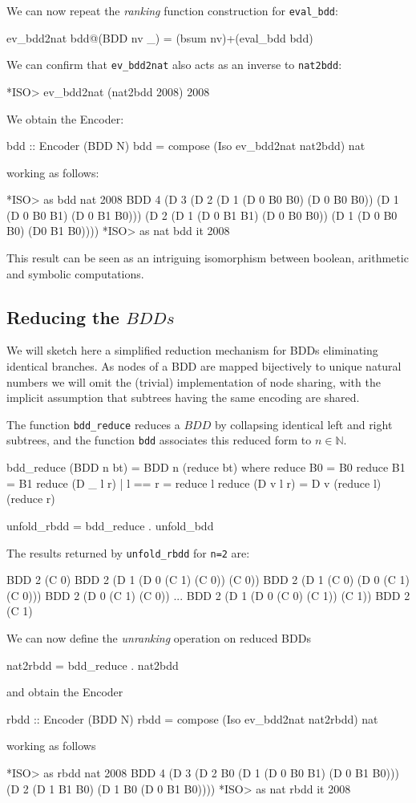 \documentclass[]{INCLUDES/llncs}
\begin{document}
We can now repeat the {\em ranking} function construction for {\tt eval\_bdd}:
\begin{code}
ev_bdd2nat bdd@(BDD nv _) = (bsum nv)+(eval_bdd bdd)
\end{code}
We can confirm that {\tt ev\_bdd2nat} also acts as an inverse to
{\tt nat2bdd}:
\begin{codex}
*ISO> ev_bdd2nat (nat2bdd 2008)
2008
\end{codex}

We obtain the Encoder:
\begin{code}
bdd :: Encoder (BDD N)
bdd = compose (Iso ev_bdd2nat nat2bdd) nat
\end{code}
working as follows:
\begin{codex}
*ISO> as bdd nat 2008
BDD 4 (D 3 (D 2 (D 1 (D 0 B0 B0) (D 0 B0 B0)) 
                (D 1 (D 0 B0 B1) (D 0 B1 B0))) 
           (D 2 (D 1 (D 0 B1 B1) (D 0 B0 B0)) 
                (D 1 (D 0 B0 B0) (D0 B1 B0))))
*ISO> as nat bdd it
2008
\end{codex}
This result can be seen as an intriguing isomorphism between
boolean, arithmetic and symbolic computations.

\subsection{Reducing the $BDDs$}
We will sketch here a simplified reduction mechanism for BDDs
eliminating identical branches. As nodes of a BDD are mapped
bijectively to unique natural numbers we will omit
the (trivial) implementation of node sharing, with the
implicit assumption that subtrees having the same encoding
are shared.

The function {\tt bdd\_reduce} reduces a $BDD$ by collapsing identical 
left and right subtrees, and the function {\tt bdd} 
associates this reduced form to $n \in \mathbb{N}$.
\begin{code}
bdd_reduce (BDD n bt) = BDD n (reduce bt) where
  reduce B0 = B0
  reduce B1 = B1
  reduce (D _ l r) | l == r = reduce l
  reduce (D v l r) = D v (reduce l) (reduce r)

unfold_rbdd = bdd_reduce . unfold_bdd  
\end{code}

The results returned by {\tt unfold\_rbdd} for {\tt n=2} are:
\begin{codex}
  BDD 2 (C 0)
  BDD 2 (D 1 (D 0 (C 1) (C 0)) (C 0))
  BDD 2 (D 1 (C 0) (D 0 (C 1) (C 0)))
  BDD 2 (D 0 (C 1) (C 0))
  ...
  BDD 2 (D 1 (D 0 (C 0) (C 1)) (C 1))
  BDD 2 (C 1)
\end{codex}
We can now define the {\em unranking} operation on reduced BDDs
\begin{code}
nat2rbdd = bdd_reduce . nat2bdd 
\end{code}
and obtain the Encoder
\begin{code}
rbdd :: Encoder (BDD N)
rbdd = compose (Iso ev_bdd2nat nat2rbdd) nat
\end{code}
working as follows
\begin{codex}
*ISO> as rbdd nat 2008
BDD 4 (D 3 (D 2 B0 (D 1 (D 0 B0 B1) (D 0 B1 B0))) 
           (D 2 (D 1 B1 B0) (D 1 B0 (D 0 B1 B0))))
*ISO> as nat rbdd it
2008
\end{codex}
\end{document}
